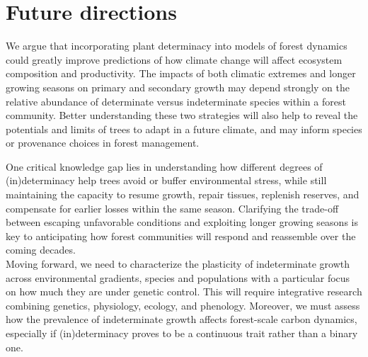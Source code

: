 \documentclass{article}
\begin{document}
	
	
\section*{Future directions}
We argue that incorporating plant determinacy into models of forest dynamics could greatly improve predictions of how climate change will affect ecosystem composition and productivity. The impacts of both climatic extremes and longer growing seasons on primary and secondary growth may depend strongly on the relative abundance of determinate versus indeterminate species within a forest community. Better understanding these two strategies will also help to reveal the potentials and limits of trees to adapt in a future climate, and may inform species or provenance choices in forest management.

One critical knowledge gap lies in understanding how different degrees of (in)determinacy help trees avoid or buffer environmental stress, while still maintaining the capacity to resume growth, repair tissues, replenish reserves, and compensate for earlier losses within the same season. Clarifying the trade-off between escaping unfavorable conditions and exploiting longer growing seasons is key to anticipating how forest communities will respond and reassemble over the coming decades.\\

Moving forward, we need to characterize the plasticity of indeterminate growth across environmental gradients, species and populations with a particular focus on how much they are under genetic control. 
This will require integrative research combining genetics, physiology, ecology, and phenology. Moreover, we must assess how the prevalence of indeterminate growth affects forest-scale carbon dynamics, especially if (in)determinacy proves to be a continuous trait rather than a binary one. 
\end{document}
